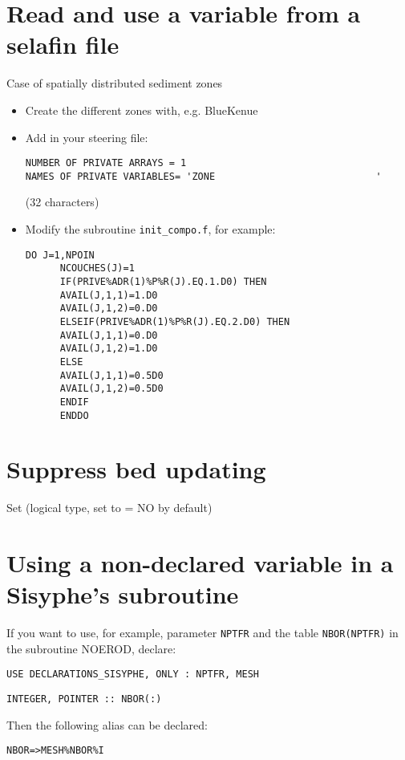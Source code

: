 \section{Read and use a variable from a selafin file}
Case of spatially distributed sediment zones

\begin{itemize}
\item Create the different zones with, e.g. BlueKenue
\item Add in your steering file:
  \begin{lstlisting}[frame=trBL]
NUMBER OF PRIVATE ARRAYS = 1
NAMES OF PRIVATE VARIABLES= 'ZONE                            '
\end{lstlisting}
(32 characters)%
\item Modify the subroutine \texttt{init\_compo.f}, for example:
\begin{lstlisting}[frame=trBL]
      DO J=1,NPOIN
      NCOUCHES(J)=1
	  IF(PRIVE%ADR(1)%P%R(J).EQ.1.D0) THEN
	  AVAIL(J,1,1)=1.D0
	  AVAIL(J,1,2)=0.D0
	  ELSEIF(PRIVE%ADR(1)%P%R(J).EQ.2.D0) THEN
	  AVAIL(J,1,1)=0.D0
	  AVAIL(J,1,2)=1.D0	 
	  ELSE 
	  AVAIL(J,1,1)=0.5D0
	  AVAIL(J,1,2)=0.5D0
	  ENDIF
      ENDDO
\end{lstlisting}
\end{itemize}



\section{Suppress bed updating}
Set  (logical type, set to {\ttfamily = NO} by default)           


\section{Using a non-declared variable in a Sisyphe's subroutine}
If you want to use, for example, parameter \texttt{NPTFR} and the table \texttt{NBOR(NPTFR)} in the subroutine NOEROD,
declare:

\texttt{USE DECLARATIONS\_SISYPHE, ONLY : NPTFR, MESH}

\texttt{INTEGER, POINTER :: NBOR(:)}

Then the following alias can be declared:

\texttt{NBOR=>MESH\%NBOR\%I}
